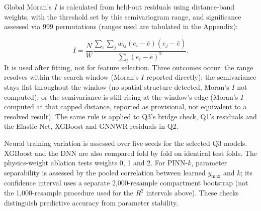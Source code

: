 \documentclass[logo,msc,ai]{infthesis}           %
\begin{document}
Global Moran's $I$ is calculated from held-out residuals using distance-band weights, with the threshold set by this semivariogram range, and significance assessed via 999 permutations (ranges used are tabulated in the Appendix):

\begin{equation}
I=\frac{N}{W}
\frac{\sum_i\sum_j w_{ij}(e_i-\bar e)(e_j-\bar e)}
{\sum_i(e_i-\bar e)^2}.
\label{eq:morans-i}
\end{equation}
It is used after fitting, not for feature selection.
Three outcomes occur: the range resolves within the search window (Moran's $I$ reported directly); the semivariance stays flat throughout the window (no spatial structure detected, Moran's $I$ not computed); or the semivariance is still rising at the window's edge (Moran's $I$ computed at that capped distance, reported as provisional, not equivalent to a resolved result). The same rule is applied to Q3's bridge check, Q1's residuals and the Elastic Net, XGBoost and GNNWR residuals in Q2.

Neural training variation is assessed over five seeds for the selected Q3 models. XGBoost and the
DNN are also compared fold by fold on identical test folds. The physics-weight ablation tests
weights 0, 1 and 2. For PINN-$k$, parameter separability is assessed by the pooled correlation
between learned $y_{\max}$ and $k$; its confidence interval uses a separate 2,000-resample compartment
bootstrap (not the 1,000-resample procedure used for the $R^2$ intervals above). These checks distinguish predictive accuracy from parameter stability.


\end{document}
